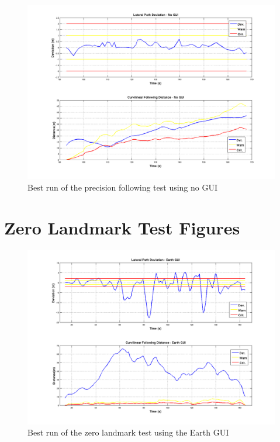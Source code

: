 \begin{figure}[ht] \centering %
    \includegraphics[width=5in]{./figs/precision_following_results_dst_dev_control.png}
    \caption{Best run of the precision following test using no GUI} \label{fig:precisionresults_control}
\end{figure}





\chapter{Zero Landmark Test Figures} \label{app:zeroresults}


\begin{figure}[ht] \centering
    \includegraphics[width=5in]{./figs/zero_landmark_results_dst_dev_earth.png}
    \caption{Best run of the zero landmark test using the Earth GUI} \label{fig:zeroresults_earth}
\end{figure}

